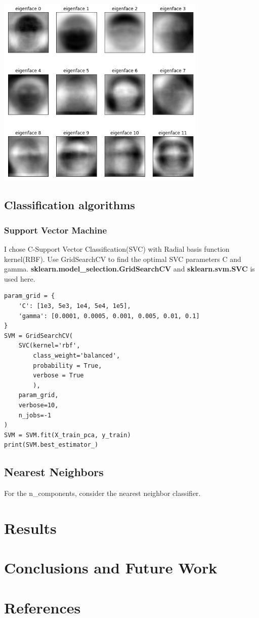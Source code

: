 \documentclass{article}
\begin{document}
\begin{center}
  \includegraphics[width=10cm]{eigenfaces.png}
\end{center}

\subsection{Classification algorithms}


\subsubsection{Support Vector Machine}
I chose C-Support Vector Classification(SVC) with Radial basis function kernel(RBF). Use GridSearchCV to find the optimal SVC parameters C and gamma.
\textbf{sklearn.model\_selection.GridSearchCV} and \textbf{sklearn.svm.SVC} is used here.
\begin{lstlisting}
param_grid = {
    'C': [1e3, 5e3, 1e4, 5e4, 1e5],
    'gamma': [0.0001, 0.0005, 0.001, 0.005, 0.01, 0.1]
}
SVM = GridSearchCV(
    SVC(kernel='rbf',
        class_weight='balanced',
        probability = True,
        verbose = True
        ),
    param_grid,
    verbose=10,
    n_jobs=-1
)
SVM = SVM.fit(X_train_pca, y_train)
print(SVM.best_estimator_)
\end{lstlisting}

\subsection{Nearest Neighbors}
For the n\_components, consider the nearest neighbor classifier.


\section{Results}


\section{Conclusions and Future Work}


\section{References}
\end{document}
